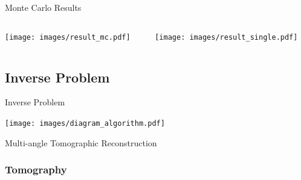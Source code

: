 \documentclass[compress,red,12pt]{beamer}
\begin{document}
\begin{frame}{Monte Carlo Results}
  \begin{columns}[T]
    \begin{column}{.5\textwidth}
      \centering
      {
        \texttt{[image: images/result\_mc.pdf]}
      }
      {
        \centerline{\def\svgwidth{0.8\linewidth}\footnotesize{}}
      }
    \end{column}
    \begin{column}{.5\textwidth}
      \centering
      {
        \texttt{[image: images/result\_single.pdf]}
      }
      {
        \centerline{\def\svgwidth{0.8\linewidth}\footnotesize{}}
      }
    \end{column}
  \end{columns}
\end{frame}


\subsection{Inverse Problem}

\begin{frame}{Inverse Problem}
  \begin{center}
    \texttt{[image: images/diagram\_algorithm.pdf]}
  \end{center}
\end{frame}

\begin{frame}{Multi-angle Tomographic Reconstruction}
  \begin{center}
    \centerline{\def\svgwidth{\linewidth}\small{}}
  \end{center}
\end{frame}


\subsubsection{Tomography}
\end{document}
